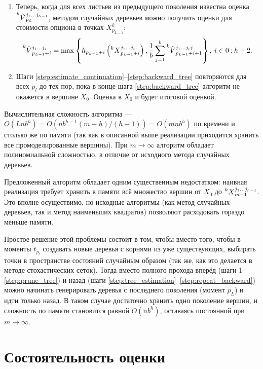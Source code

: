 \begin{enumerate}[noitemsep]
	\item\label{step:backward_tree} Теперь, когда для всех листьев из предыдущего поколения известна оценка $\prescript{k}{}{\hat{V}}_{p_L}^{j_1 \ldots j_{h-1}}$, методом случайных деревьев можно получить оценки для стоимости опциона в точках $X_{p_{L-1}}^k$:
	$$\prescript{k}{}{\hat{V}}_{p_{L-1}+i}^{j_1 \ldots j_i} = \max \left\lbrace h_{p_{L-1}+i} \left( \prescript{k}{}{X}_{p_{L-1}+i}^{j_1 \ldots j_i} \right), \frac{1}{b} \sum_{j = 1}^b \prescript{k}{}{\hat{V}}_{p_{L-1}+i+1}^{j_1 \ldots j_i j}\right\rbrace, \: i\in{0\mathbin{:} {h-2}}.$$

	\item\label{step:repeat_backward} Шаги \ref{step:estimate_continuation}--\ref{step:backward_tree} повторяются для всех $p_l$ до тех пор, пока в конце шага \ref{step:backward_tree} алгоритм не окажется в вершине $X_0$. Оценка в $X_0$ и будет итоговой оценкой.
\end{enumerate}

Вычислительная сложность алгоритма --- $O(Lnb^h) = O(nb^{h-1} (m-h) / (h-1)) = O(mnb^h)$ по времени и столько же по памяти (так как в описанной выше реализации приходится хранить все промоделированные вершины). При $m\to\infty$ алгоритм обладает полиномиальной сложностью, в отличие от исходного метода случайных деревьев.

Предложенный алгоритм обладает одним существенным недостатком: наивная реализация требует хранить в памяти всё множество вершин от $X_0$ до $\prescript{k}{}{X}_{m-1}^{j_1 \ldots j_{h-1}}$. Это вполне осуществимо, но исходные алгоритмы (как метод случайных деревьев, так и метод наименьших квадратов) позволяют расходовать гораздо меньше памяти.

Простое решение этой проблемы состоит в том, чтобы вместо того, чтобы в моменты $t_{p_l}$ создавать новые деревья с корнями из уже существующих, выбирать точки в пространстве состояний случайным образом (так же, как это делается в методе стохастических сеток). Тогда вместо полного прохода вперёд (шаги 1--\ref{step:prune_tree}) и назад (шаги \ref{step:tree_estimation}--\ref{step:repeat_backward}) можно начинать генерировать деревья с последнего поколения (момент $p_L$) и идти только назад. В таком случае достаточно хранить одно поколение вершин, и сложность по памяти становится равной $O(nb^h)$, оставаясь постоянной при $m\to\infty$.


\section{Состоятельность оценки} %
\label{sec:tree_pruning:consistency}

